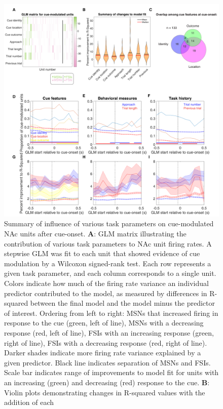 \documentclass[11pt]{article}
\newcommand{\bsf}[1]{\textbf{#1}}
\begin{document}
 \begin{figure}[ht!]
\centering
\includegraphics[height=0.5\textheight]{Fig 5 - GLM.pdf}
\caption{Summary of influence of various task parameters on
  cue-modulated NAc units after cue-onset. \bsf{A}: GLM matrix
  illustrating the contribution of various task parameters to NAc unit
  firing rates. A stepwise GLM was fit to each unit that showed
  evidence of cue modulation by a Wilcoxon signed-rank test. Each row
  represents a given task parameter, and each column corresponds to a
  single unit. Colors indicate how much of the firing rate variance an
  individual predictor contributed to the model, as measured by
  differences in R-squared between the final model and the model minus
  the predictor of interest. Ordering from left to right: MSNs that
  increased firing in response to the cue (green, left of line), MSNs
  with a decreasing response (red, left of line), FSIs with an
  increasing response (green, right of line), FSIs with a decreasing
  response (red, right of line). Darker shades indicate more firing
  rate variance explained by a given predictor. Black line indicates
  separation of MSNs and FSIs. Scale bar indicates range of
  improvements to model fit for units with an increasing (green) and
  decreasing (red) response to the cue. \bsf{B}: Violin plots
  demonstrating changes in R-squared values with the addition of each
}
\end{figure}
\end{document}
